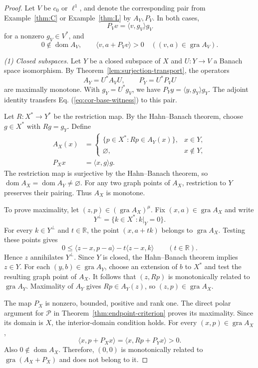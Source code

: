 \documentclass[11pt]{article}
\newcommand{\R}{\mathbb R}
\newcommand{\gra}{\operatorname{gra}}
\newcommand{\dom}{\operatorname{dom}}
\newcommand{\pair}[2]{\langle #1,#2\rangle}
\theoremstyle{definition}
\theoremstyle{remark}
\begin{document}
\begin{proof}
Let $V$ be $c_0$ or $\ell^1$, and denote the corresponding pair from Example~\ref{thm:C} or Example~\ref{thm:L} by $A_V,P_V$. In both cases,
\[
P_Vv=\pair{v}{g_V}g_V
\]
for a nonzero $g_V\in V^*$, and
\begin{equation}
0\notin\dom A_V,\qquad
\pair{v}{a+P_Vv}>0
\quad((v,a)\in\gra A_V).
\label{eq:cor-base-witness}
\end{equation}

\noindent\textit{(1) Closed subspaces.}
Let $Y$ be a closed subspace of $X$ and $U:Y\to V$ a Banach space isomorphism. By Theorem~\ref{lem:surjection-transport}, the operators
\[
A_Y=U^*A_VU,\qquad P_Y=U^*P_VU
\]
are maximally monotone. With $g_Y=U^*g_V$, we have $P_Yy=\pair{y}{g_Y}g_Y$. The adjoint identity transfers Eq. (\ref{eq:cor-base-witness}) to this pair.

Let $R:X^*\to Y^*$ be the restriction map. By the Hahn--Banach theorem, choose $g\in X^*$ with $Rg=g_Y$. Define
\[
\begin{aligned}
A_X(x)&=
\begin{cases}
\{p\in X^*:Rp\in A_Y(x)\},&x\in Y,\\
\varnothing,&x\notin Y,
\end{cases}\\
P_Xx&=\pair{x}{g}g.
\end{aligned}
\]
The restriction map is surjective by the Hahn--Banach theorem, so $\dom A_X=\dom A_Y\ne\varnothing$. For any two graph points of $A_X$, restriction to $Y$ preserves their pairing. Thus $A_X$ is monotone.

To prove maximality, let $(z,p)\in(\gra A_X)^\mu$. Fix $(x,a)\in\gra A_X$ and write
\[
Y^\perp=\{k\in X^*:k|_Y=0\}.
\]
For every $k\in Y^\perp$ and $t\in\R$, the point $(x,a+tk)$ belongs to $\gra A_X$. Testing these points gives
\[
0\le\pair{z-x}{p-a}-t\pair{z-x}{k}
\qquad(t\in\R).
\]
Hence $z$ annihilates $Y^\perp$. Since $Y$ is closed, the Hahn--Banach theorem implies $z\in Y$. For each $(y,b)\in\gra A_Y$, choose an extension of $b$ to $X^*$ and test the resulting graph point of $A_X$. It follows that $(z,Rp)$ is monotonically related to $\gra A_Y$. Maximality of $A_Y$ gives $Rp\in A_Y(z)$, so $(z,p)\in\gra A_X$.

The map $P_X$ is nonzero, bounded, positive and rank one. The direct polar argument for $\mathcal P$ in Theorem~\ref{thm:endpoint-criterion} proves its maximality. Since its domain is $X$, the interior-domain condition holds. For every $(x,p)\in\gra A_X$,
\[
\pair{x}{p+P_Xx}
=\pair{x}{Rp+P_Yx}>0.
\]
Also $0\notin\dom A_X$. Therefore, $(0,0)$ is monotonically related to $\gra(A_X+P_X)$ and does not belong to it.


\end{proof}
\end{document}
